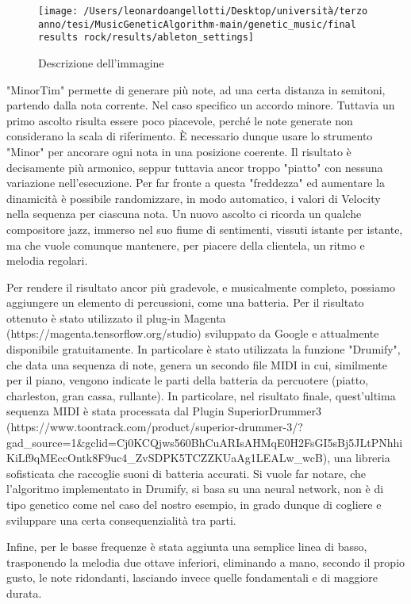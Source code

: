 \documentclass[a4paper,12pt]{report}
\begin{document}
\begin{figure}[h!]
    \centering
    \texttt{[image: /Users/leonardoangellotti/Desktop/università/terzo anno/tesi/MusicGeneticAlgorithm-main/genetic\_music/final results rock/results/ableton\_settings]} 
    \caption{Descrizione dell'immagine}
    \label{fig:immagine}
\end{figure}

"MinorTim" permette di generare più note, ad una certa distanza in semitoni, partendo dalla nota corrente. 
Nel caso specifico un accordo minore.
Tuttavia un primo ascolto risulta essere poco piacevole, perché le note generate non considerano la scala di riferimento.
È necessario dunque usare lo strumento "Minor" per ancorare ogni nota in una posizione coerente.
Il risultato è decisamente più armonico, seppur tuttavia ancor troppo "piatto" con nessuna variazione nell'esecuzione.
Per far fronte a questa "freddezza" ed aumentare la dinamicità è possibile randomizzare, in modo automatico, i valori di Velocity nella sequenza per ciascuna nota.
Un nuovo ascolto ci ricorda un qualche compositore jazz, immerso nel suo fiume di sentimenti, vissuti istante per istante, 
ma che vuole comunque mantenere, per piacere della clientela, un ritmo e melodia regolari.

Per rendere il risultato ancor più gradevole, e musicalmente completo, possiamo aggiungere un elemento di percussioni, come una batteria.
Per il risultato ottenuto è stato utilizzato il plug-in Magenta (https://magenta.tensorflow.org/studio) sviluppato da Google e attualmente disponibile gratuitamente.
In particolare è stato utilizzata la funzione "Drumify", che data una sequenza di note, genera un secondo file MIDI in cui, similmente per il piano, vengono indicate le parti della batteria da percuotere (piatto, charleston, gran cassa, rullante).
In particolare, nel risultato finale, quest'ultima sequenza MIDI è stata processata dal Plugin SuperiorDrummer3 (https://www.toontrack.com/product/superior-drummer-3/?gad_source=1&gclid=Cj0KCQjws560BhCuARIsAHMqE0H2FsGI5sBj5JLtPNhhiKiLf9qMEccOntk8F9uc4_ZvSDPK5TCZZKUaAg1LEALw_wcB),
una libreria sofisticata che raccoglie suoni di batteria accurati.
Si vuole far notare, che l'algoritmo implementato in Drumify, si basa su una neural network, non è di tipo genetico come nel caso del nostro esempio, in grado dunque di cogliere e sviluppare una certa consequenzialità tra parti.

Infine, per le basse frequenze è stata aggiunta una semplice linea di basso, trasponendo la melodia due ottave inferiori, eliminando a mano, secondo il propio gusto, le note ridondanti, lasciando invece quelle fondamentali e di maggiore durata.
\end{document}
